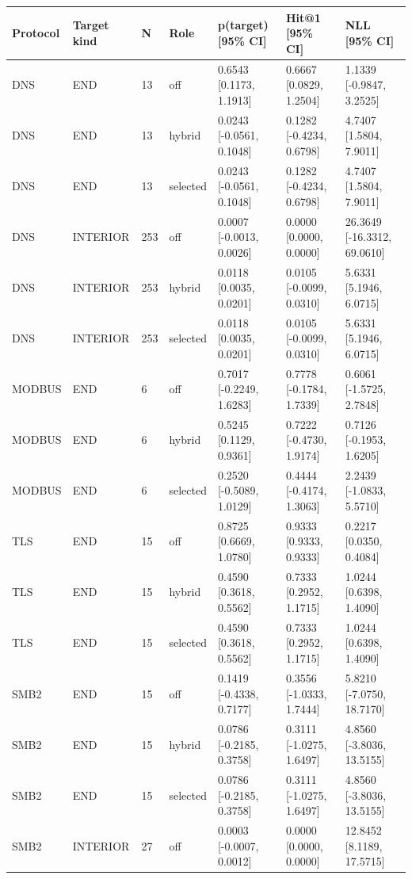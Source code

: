 \begin{tabular}{lllllll}
\hline
Protocol & Target kind & N & Role & p(target) [95\% CI] & Hit@1 [95\% CI] & NLL [95\% CI] \\
\hline
DNS & END & 13 & off & 0.6543 [0.1173, 1.1913] & 0.6667 [0.0829, 1.2504] & 1.1339 [-0.9847, 3.2525] \\
DNS & END & 13 & hybrid & 0.0243 [-0.0561, 0.1048] & 0.1282 [-0.4234, 0.6798] & 4.7407 [1.5804, 7.9011] \\
DNS & END & 13 & selected & 0.0243 [-0.0561, 0.1048] & 0.1282 [-0.4234, 0.6798] & 4.7407 [1.5804, 7.9011] \\
DNS & INTERIOR & 253 & off & 0.0007 [-0.0013, 0.0026] & 0.0000 [0.0000, 0.0000] & 26.3649 [-16.3312, 69.0610] \\
DNS & INTERIOR & 253 & hybrid & 0.0118 [0.0035, 0.0201] & 0.0105 [-0.0099, 0.0310] & 5.6331 [5.1946, 6.0715] \\
DNS & INTERIOR & 253 & selected & 0.0118 [0.0035, 0.0201] & 0.0105 [-0.0099, 0.0310] & 5.6331 [5.1946, 6.0715] \\
MODBUS & END & 6 & off & 0.7017 [-0.2249, 1.6283] & 0.7778 [-0.1784, 1.7339] & 0.6061 [-1.5725, 2.7848] \\
MODBUS & END & 6 & hybrid & 0.5245 [0.1129, 0.9361] & 0.7222 [-0.4730, 1.9174] & 0.7126 [-0.1953, 1.6205] \\
MODBUS & END & 6 & selected & 0.2520 [-0.5089, 1.0129] & 0.4444 [-0.4174, 1.3063] & 2.2439 [-1.0833, 5.5710] \\
TLS & END & 15 & off & 0.8725 [0.6669, 1.0780] & 0.9333 [0.9333, 0.9333] & 0.2217 [0.0350, 0.4084] \\
TLS & END & 15 & hybrid & 0.4590 [0.3618, 0.5562] & 0.7333 [0.2952, 1.1715] & 1.0244 [0.6398, 1.4090] \\
TLS & END & 15 & selected & 0.4590 [0.3618, 0.5562] & 0.7333 [0.2952, 1.1715] & 1.0244 [0.6398, 1.4090] \\
SMB2 & END & 15 & off & 0.1419 [-0.4338, 0.7177] & 0.3556 [-1.0333, 1.7444] & 5.8210 [-7.0750, 18.7170] \\
SMB2 & END & 15 & hybrid & 0.0786 [-0.2185, 0.3758] & 0.3111 [-1.0275, 1.6497] & 4.8560 [-3.8036, 13.5155] \\
SMB2 & END & 15 & selected & 0.0786 [-0.2185, 0.3758] & 0.3111 [-1.0275, 1.6497] & 4.8560 [-3.8036, 13.5155] \\
SMB2 & INTERIOR & 27 & off & 0.0003 [-0.0007, 0.0012] & 0.0000 [0.0000, 0.0000] & 12.8452 [8.1189, 17.5715] \\

\end{tabular}
